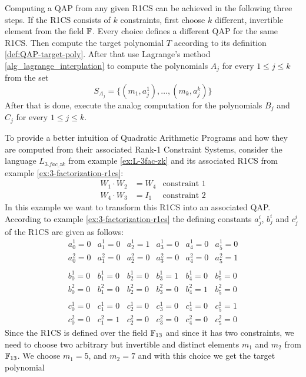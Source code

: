 Computing a QAP from any given R1CS can be achieved in the following three steps. If the R1CS consists of $k$ constraints, first choose $k$ different, invertible element from the field $\mathbb{F}$. Every choice defines a different QAP for the same R1CS. Then compute the target polynomial $T$ according to its definition \ref{def:QAP-target-poly}. After that use Lagrange's method \ref{alg_lagrange_interplation} to compute the polynomials $A_j$ for every $1\leq j \leq k$ from the set 
\begin{equation}
S_{A_j} = \{(m_1,a^1_j),\ldots,(m_k,a^k_j)\}
\end{equation}
After that is done, execute the analog computation for the polynomials $B_j$ and $C_j$ for every $1\leq j \leq k$. 
\begin{example}
\label{ex:3-fac-QAP}  To provide a better intuition of Quadratic Arithmetic Programs and how they are computed from their associated Rank-1 Constraint Systems, consider the language $L_{3.fac\_zk}$ from example \ref{ex:L-3fac-zk} and its associated R1CS from example \ref{ex:3-factorization-r1cs}:
\begin{align*}
W_1 \cdot W_2 & = W_4 & \text{constraint } 1\\
W_4 \cdot W_3 & = I_1 & \text{constraint } 2
\end{align*}
In this example we want to transform this R1CS into an associated QAP. According to example \ref{ex:3-factorization-r1cs} the defining constants $a_j^i$, $b_j^i$ and $c_j^i$ of the R1CS are given as follows:
$$
\begin{array}{llllll}
a_0^1 = 0 & a_1^1= 0 & a_2^1= 1 & a_3^1 = 0 & a_4^1= 0  & a_5^1= 0 \\ 
a_0^2 = 0 & a_1^2= 0 & a_2^2= 0 & a_3^2 = 0 & a_4^2= 0  & a_5^2= 1 \\ 
\\
b_0^1 = 0 & b_1^1= 0 & b_2^1= 0 & b_3^1 = 1 & b_4^1= 0  & b_5^1= 0 \\ 
b_0^2 = 0 & b_1^2= 0 & b_2^2= 0 & b_3^2 = 0 & b_4^2= 1  & b_5^2= 0 \\ 
\\
c_0^1 = 0 & c_1^1= 0 & c_2^1= 0 & c_3^1 = 0 & c_4^1= 0  & c_5^1= 1 \\ 
c_0^2 = 0 & c_1^2= 1 & c_2^2= 0 & c_3^2 = 0 & c_4^2= 0  & c_5^2= 0 
\end{array} 
$$
Since the R1CS is defined over the field $\mathbb{F}_{13}$ and since it has two constraints, we need to choose two arbitrary but invertible and distinct elements $m_1$ and $m_2$ from $\mathbb{F}_{13}$. We choose $m_{1}=5$, and $m_{2}=7$ and with this choice we get the target polynomial

\end{example}
